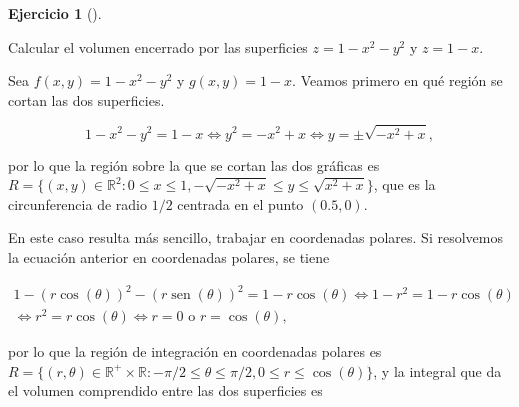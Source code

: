 \documentclass[
  spanish,
  a4paper,
]{scrreport}
\theoremstyle{definition}
\newtheorem{exercise}{Ejercicio}[chapter]
\theoremstyle{remark}
\begin{document}
\begin{exercise}[]\protect\hypertarget{exr-volumen-entre-dos-superficies}{}\label{exr-volumen-entre-dos-superficies}

Calcular el volumen encerrado por las superficies \(z=1-x^2-y^2\) y
\(z=1-x\).

\end{exercise}

\begin{tcolorbox}[enhanced jigsaw, arc=.35mm, bottomrule=.15mm, bottomtitle=1mm, breakable, colback=white, colbacktitle=quarto-callout-tip-color!10!white, colframe=quarto-callout-tip-color-frame, coltitle=black, left=2mm, leftrule=.75mm, opacityback=0, opacitybacktitle=0.6, rightrule=.15mm, title=\textcolor{quarto-callout-tip-color}{\faLightbulb}\hspace{0.5em}{Solución}, titlerule=0mm, toprule=.15mm, toptitle=1mm]

Sea \(f(x,y)=1-x^2-y^2\) y \(g(x,y)=1-x\). Veamos primero en qué región
se cortan las dos superficies.

\[
1-x^2-y^2 = 1 -x \Leftrightarrow y^2 = -x^2+x \Leftrightarrow y=\pm\sqrt{-x^2+x},
\]

por lo que la región sobre la que se cortan las dos gráficas es
\(R=\{(x,y)\in\mathbb{R}^2: 0\leq x\leq 1, -\sqrt{-x^2+x}\leq y\leq \sqrt{x^2+x}\}\),
que es la circunferencia de radio \(1/2\) centrada en el punto
\((0.5,0)\).

En este caso resulta más sencillo, trabajar en coordenadas polares. Si
resolvemos la ecuación anterior en coordenadas polares, se tiene

\[
\begin{gathered}
1-(r\cos(\theta))^2-(r\operatorname{sen}(\theta))^2 = 1-r\cos(\theta)
\Leftrightarrow 1-r^2 = 1-r\cos(\theta) \\
\Leftrightarrow r^2 = r\cos(\theta)
\Leftrightarrow r=0 \mbox{ o } r=\cos(\theta),
\end{gathered}
\]

por lo que la región de integración en coordenadas polares es
\(R=\{(r,\theta)\in \mathbb{R}^+\times \mathbb{R}: -\pi/2\leq \theta\leq \pi/2, 0\leq r\leq \cos(\theta)\}\),
y la integral que da el volumen comprendido entre las dos superficies es


\end{tcolorbox}
\end{document}
